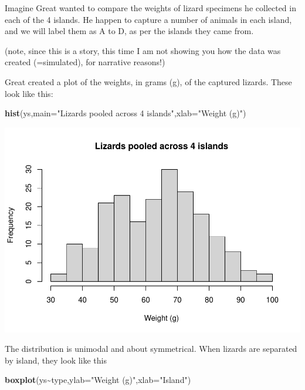 \documentclass[
]{book}
\newenvironment{Shaded}{\begin{snugshade}}{\end{snugshade}}
\newcommand{\AttributeTok}[1]{\textcolor[rgb]{0.13,0.29,0.53}{#1}}
\newcommand{\FunctionTok}[1]{\textcolor[rgb]{0.13,0.29,0.53}{\textbf{#1}}}
\newcommand{\NormalTok}[1]{#1}
\newcommand{\SpecialCharTok}[1]{\textcolor[rgb]{0.81,0.36,0.00}{\textbf{#1}}}
\newcommand{\StringTok}[1]{\textcolor[rgb]{0.31,0.60,0.02}{#1}}
\begin{document}
Imagine Great wanted to compare the weights of lizard specimens he collected in each of the 4 islands. He happen to capture a number of animals in each island, and we will label them as A to D, as per the islands they came from.

(note, since this is a story, this time I am not showing you how the data was created (=simulated), for narrative reasons!)

Great created a plot of the weights, in grams (g), of the captured lizards. These look like this:

\begin{Shaded}
\begin{Highlighting}[]
\FunctionTok{hist}\NormalTok{(ys,}\AttributeTok{main=}\StringTok{"Lizards pooled across 4 islands"}\NormalTok{,}\AttributeTok{xlab=}\StringTok{"Weight (g)"}\NormalTok{)}
\end{Highlighting}
\end{Shaded}

\includegraphics{ECOMODbook_files/figure-latex/a10.2-1.pdf}

The distribution is unimodal and about symmetrical. When lizards are separated by island, they look like this

\begin{Shaded}
\begin{Highlighting}[]
\FunctionTok{boxplot}\NormalTok{(ys}\SpecialCharTok{\textasciitilde{}}\NormalTok{type,}\AttributeTok{ylab=}\StringTok{"Weight (g)"}\NormalTok{,}\AttributeTok{xlab=}\StringTok{"Island"}\NormalTok{)}
\end{Highlighting}
\end{Shaded}
\end{document}
